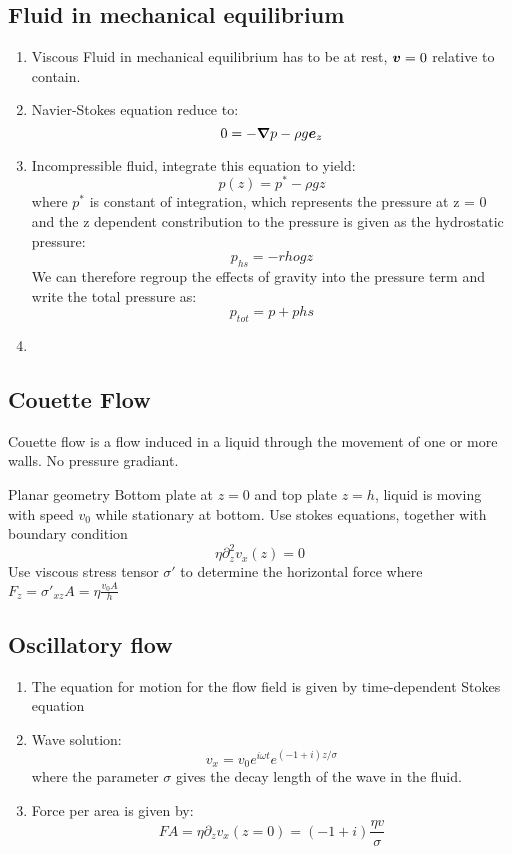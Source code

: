 \documentclass[12pt,a4paper]{article}
\begin{document}
        \subsection{Fluid in mechanical equilibrium}
            \begin{enumerate}
                \item Viscous Fluid in mechanical equilibrium has to be at rest, $\vb*{v}=0$ relative to contain.
                \item Navier-Stokes equation reduce to:
                $$
                    0 = -\grad{p} -\rho g \vb*{e}_z
                $$
                \item Incompressible fluid, integrate this equation to yield:
                $$
                    p(z) = p^{*} - \rho g z
                $$
                where $p^{*}$ is constant of integration, which represents the pressure at z = 0 and the z dependent constribution to the pressure is given as the hydrostatic pressure:
                $$
                    p_{hs} = - rho gz
                $$
                We can therefore regroup the effects of gravity into the pressure term and write the total pressure as:
                $$
                    p_{tot} = p + p{hs}
                $$
                \item 
            \end{enumerate}
        \subsection{Couette Flow}
            Couette flow is  a flow induced in a liquid through the movement of one or more walls. No pressure gradiant.  
            \begin{example}
                {Planar geometry}{
                    Bottom plate at $z=0$ and top plate $z=h$, liquid is moving with speed $v_0$ while stationary at bottom.
                    Use stokes equations, together with boundary condition
                    $$
                        \eta \partial^2_z v_x(z) = 0
                    $$
                    Use viscous stress tensor $\sigma '$ to determine the horizontal force where $F_z=\sigma '_{xz}A = \eta \frac{v_0 A}{h}$
                }
            \end{example}
        \subsection{Oscillatory flow}
            \begin{enumerate}
                \item The equation for motion for the flow field is given by time-dependent Stokes equation
                
                \item Wave solution:
                $$
                    v_x = v_0 e^{i\omega t}e^{(-1+i)z/\sigma}
                $$
                where the parameter $\sigma$ gives the decay length of the wave in the fluid.
                \item Force per area is given by:
                $$
                    FA = \eta \partial_z v_x (z=0) = (-1+i) \frac {\eta v}{\sigma}
                $$
            \end{enumerate}
\end{document}
